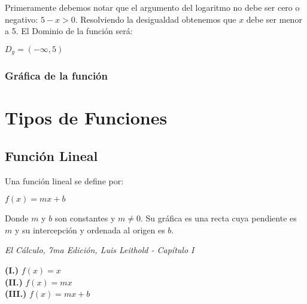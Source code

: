 \documentclass[12pt,a4paper]{book}
\begin{document}
{Primeramente debemos notar que el argumento del logaritmo no debe ser cero o negativo: $5-x>0$. Resolviendo la desigualdad obtenemos que $x$ debe ser menor a 5.
El Dominio de la función será:
\begin{center}
$D_g=(-\infty,5)$
\end{center}
\subsubsection{Gráfica de la función}

\begin{center}
\end{center}

\section{Tipos de Funciones}
\subsection{Función Lineal}
\begin{framed}\noindent
Una función lineal se define por:
\begin{center}
$f(x) = mx + b$
\end{center}
Donde $m$ y $b$ son constantes y $m \neq 0$. Su gráfica es una recta cuya pendiente es $m$ y su intercepción y ordenada al origen es $b$.
\begin{flushright}
\textit{{\scriptsize El Cálculo, 7ma Edición, Luis Leithold - Capítulo I}}
\end{flushright}
\vspace{-0.5cm}
\end{framed}

\begin{framed}\noindent
\textbf{(I.)} $f(x)=x$\\${ }$\\
\textbf{(II.)} $f(x)=mx$ \\${ }$\\
\textbf{(III.)} $f(x)=mx + b$
\end{framed}
\\${ }$\\

}
\end{document}
